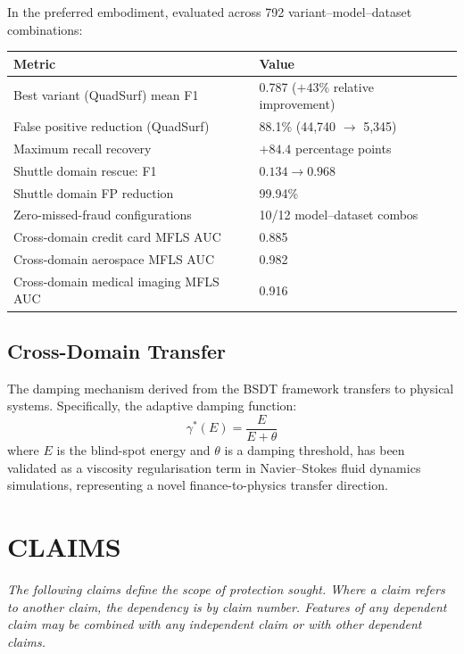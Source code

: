\documentclass[12pt,a4paper]{article}
\begin{document}
In the preferred embodiment, evaluated across 792 variant--model--dataset 
combinations:

\begin{center}
\begin{tabular}{ll}
\toprule
\textbf{Metric} & \textbf{Value} \\
\midrule
Best variant (QuadSurf) mean F1 & 0.787 ($+43\%$ relative improvement) \\
False positive reduction (QuadSurf) & 88.1\% (44,740 $\to$ 5,345) \\
Maximum recall recovery & $+84.4$ percentage points \\
Shuttle domain rescue: F1 & $0.134 \to 0.968$ \\
Shuttle domain FP reduction & 99.94\% \\
Zero-missed-fraud configurations & 10/12 model--dataset combos \\
Cross-domain credit card MFLS AUC & 0.885 \\
Cross-domain aerospace MFLS AUC & 0.982 \\
Cross-domain medical imaging MFLS AUC & 0.916 \\
\bottomrule
\end{tabular}
\end{center}

\subsection{Cross-Domain Transfer}

The damping mechanism derived from the BSDT framework transfers to physical 
systems. Specifically, the adaptive damping function:
\begin{equation}
\gamma^*(E) = \frac{E}{E + \theta}
\end{equation}
where $E$ is the blind-spot energy and $\theta$ is a damping threshold, has 
been validated as a viscosity regularisation term in Navier--Stokes fluid 
dynamics simulations, representing a novel finance-to-physics transfer 
direction.

\section{CLAIMS}

\noindent\textit{The following claims define the scope of protection
sought. Where a claim refers to another claim, the dependency is by claim
number. Features of any dependent claim may be combined with any
independent claim or with other dependent claims.}
\vspace{0.8em}
\end{document}
